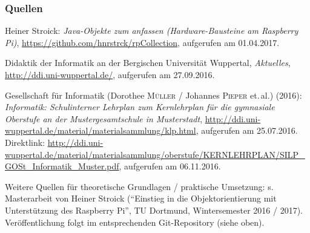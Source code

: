 \documentclass[usenames,dvipsnames]{beamer}
\newcommand \etal{et.\,al.\xspace }
\begin{document}

\begin{frame}
\frametitle{Quellen}
\footnotesize{
\begin{thebibliography}{99}

 Heiner Stroick: \emph{Java-Objekte zum anfassen (Hardware-Bausteine am Raspberry Pi)}, \url{https://github.com/hnrstrck/rpCollection}, aufgerufen am 01.04.2017.

 Didaktik der Informatik an der Bergischen Universität Wuppertal, \emph{Aktuelles}, \url{http://ddi.uni-wuppertal.de/}, aufgerufen am 27.09.2016.

 Gesellschaft für Informatik (Dorothee \textsc{Müller} / Johannes \textsc{Pieper} \etal) (2016): \emph{Informatik: Schulinterner Lehrplan zum Kernlehrplan für die gymnasiale Oberstufe an der Mustergesamtschule in Musterstadt}, \url{http://ddi.uni-wuppertal.de/material/materialsammlung/klp.html}, aufgerufen am 25.07.2016. Direktlink: \url{http://ddi.uni-wuppertal.de/material/materialsammlung/oberstufe/KERNLEHRPLAN/SILP_GOSt_Informatik_Muster.pdf}, aufgerufen am 06.11.2016.

 Weitere Quellen für theoretische Grundlagen / praktische Umsetzung: s. Masterarbeit von Heiner Stroick (\enquote{Einstieg in die Objektorientierung mit Unterstützung des Raspberry Pi}, TU Dortmund, Wintersemester 2016 / 2017). Veröffentlichung folgt im entsprechenden Git-Repository (siehe oben).

\end{thebibliography}
}
\end{frame}

\end{document}

